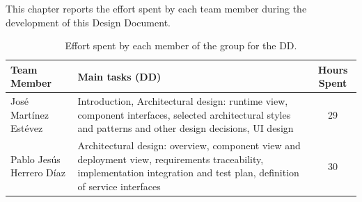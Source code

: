 This chapter reports the effort spent by each team member during the development of this Design Document.

\begin{table}[H]
    \centering
    \begin{tabular}{|p{}|p{}|c|}
        \hline
        \textbf{Team Member} & \textbf{Main tasks (DD)} & \textbf{Hours Spent} \\ 
        \hline
        José Martínez Estévez &
        Introduction, Architectural design: runtime view, component interfaces, selected architectural styles and patterns and other design decisions, UI design & 29 \\ 
        \hline
        Pablo Jesús Herrero Díaz &
        Architectural design: overview, component view and deployment view, requirements traceability, implementation integration and test plan, definition of service interfaces & 30 \\ 
        \hline
    \end{tabular}
    \caption{Effort spent by each member of the group for the DD.}
    \label{tab:effort_spent_dd}
\end{table}
